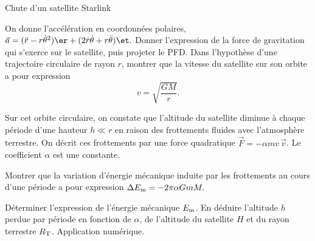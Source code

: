 \begin{exo}[MPII][2][TD]{Chute d'un satellite Starlink}
\begin{quest}
  \item On donne l'accélération en coordonnées polaires,
  $\Vec{a} = (\ddot{r}-r\dot{\theta}^2) \er + (2\dot{r} \dot{\theta} + r \ddot{\theta}) \et.$ Donner l'expression de la force de gravitation qui s'exerce sur le satellite, puis projeter le PFD. Dans l'hypothèse d'une trajectoire circulaire de rayon $r$, montrer  que la vitesse du satellite sur son orbite a pour expression
  $$
  v = \sqrt{\frac{GM}{r}}.
  $$

  \end{quest}

  Sur cet orbite circulaire, on constate que l'altitude du satellite diminue à chaque période d'une hauteur $h \ll r$ en raison des frottements fluides avec l'atmosphère terrestre. On décrit ces frottements par une force quadratique $\Vec{F} = - \alpha m v \,\Vec{v}$. Le coefficient $\alpha$ est
une constante.

\begin{quest}

  \item Montrer que la variation d'énergie mécanique induite par les frottements au cours d'une période a pour expression
  $
  \Delta E_{\rm m} = -2\pi \alpha G m M.
  $


  \item Déterminer l'expression de l'énergie mécanique $E_{\rm m}$. En déduire l'altitude $h$ perdue par période en fonction de $\alpha$, de l'altitude du satellite $H$ et du rayon terrestre $R_{\rm T}$. Application numérique.


\end{quest}
\end{exo}
